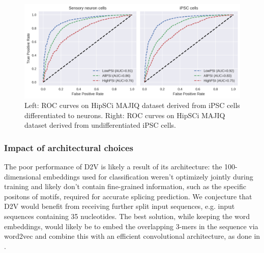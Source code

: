 \begin{figure}
	\centering\includegraphics[width=1\textwidth]{../visualizations/ch5-results/majiq_neuron_ipsc_cross_psi_roc_auc_comparison.png} 
	\caption{Left: ROC curves on HipSCi MAJIQ dataset derived from iPSC cells differentiated to neurons. Right: ROC curves on HipSCi MAJIQ dataset derived from undifferentiated iPSC cells. }
	\label{fig:majiq_rocs_low_high}
\end{figure}




\subsubsection{Impact of architectural choices} \label{subsubsec:majiq_architectural_choices}
The poor performance of D2V is likely a result of its architecture: the 100-dimensional embeddings used for classification weren't optimizely jointly during training and likely don't contain fine-grained information, such as the specific positons of motifs, required for accurate splicing prediction. We conjecture that D2V would benefit from receiving further split input sequences, e.g. input sequences containing 35 nucleotides. The best solution, while keeping the word embeddings, would likely be to embed the overlapping 3-mers in the sequence via word2vec and combine this with an efficient convolutional architecture, as done in \cite{d2vsplicing}.



